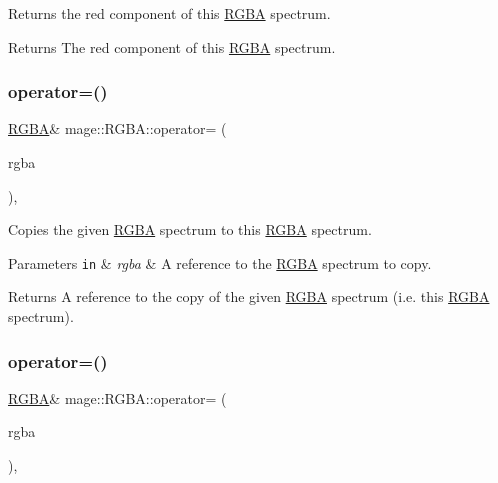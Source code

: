 Returns the red component of this \mbox{\hyperlink{structmage_1_1_r_g_b_a}{R\+G\+BA}} spectrum.

\begin{DoxyReturn}{Returns}
The red component of this \mbox{\hyperlink{structmage_1_1_r_g_b_a}{R\+G\+BA}} spectrum. 
\end{DoxyReturn}
\mbox{\label{structmage_1_1_r_g_b_a_a96b9f7d1b17cc68b8b0949eefe3d3e5c}} 
\subsubsection{\texorpdfstring{operator=()}{operator=()}\hspace{0.1cm}{\footnotesize\ttfamily [1/2]}}
{\footnotesize\ttfamily \mbox{\hyperlink{structmage_1_1_r_g_b_a}{R\+G\+BA}}\& mage\+::\+R\+G\+B\+A\+::operator= (\begin{DoxyParamCaption}\item[{const \mbox{\hyperlink{structmage_1_1_r_g_b_a}{R\+G\+BA}} \&}]{rgba }\end{DoxyParamCaption})\hspace{0.3cm}{\ttfamily [default]}, {\ttfamily [noexcept]}}

Copies the given \mbox{\hyperlink{structmage_1_1_r_g_b_a}{R\+G\+BA}} spectrum to this \mbox{\hyperlink{structmage_1_1_r_g_b_a}{R\+G\+BA}} spectrum.


\begin{DoxyParams}[1]{Parameters}
\mbox{\tt in}  & {\em rgba} & A reference to the \mbox{\hyperlink{structmage_1_1_r_g_b_a}{R\+G\+BA}} spectrum to copy. \\
\hline
\end{DoxyParams}
\begin{DoxyReturn}{Returns}
A reference to the copy of the given \mbox{\hyperlink{structmage_1_1_r_g_b_a}{R\+G\+BA}} spectrum (i.\+e. this \mbox{\hyperlink{structmage_1_1_r_g_b_a}{R\+G\+BA}} spectrum). 
\end{DoxyReturn}
\mbox{\label{structmage_1_1_r_g_b_a_afcac58d6a76659c2a5821b8c957fc90e}} 
\subsubsection{\texorpdfstring{operator=()}{operator=()}\hspace{0.1cm}{\footnotesize\ttfamily [2/2]}}
{\footnotesize\ttfamily \mbox{\hyperlink{structmage_1_1_r_g_b_a}{R\+G\+BA}}\& mage\+::\+R\+G\+B\+A\+::operator= (\begin{DoxyParamCaption}\item[{\mbox{\hyperlink{structmage_1_1_r_g_b_a}{R\+G\+BA}} \&\&}]{rgba }\end{DoxyParamCaption})\hspace{0.3cm}{\ttfamily [default]}, {\ttfamily [noexcept]}}

